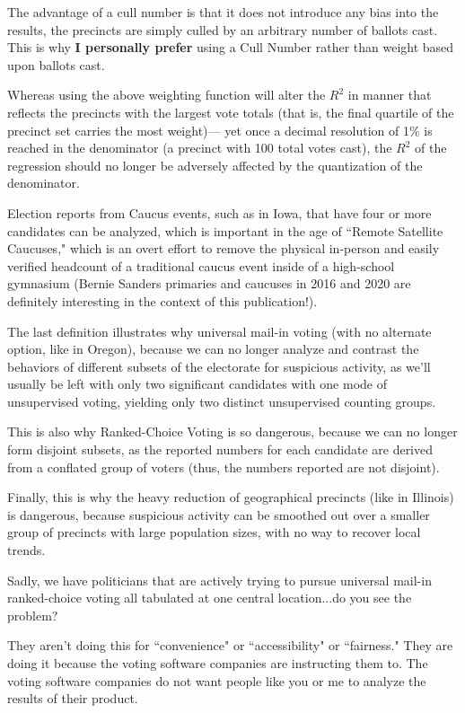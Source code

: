 \documentclass[preprint,13pt]{elsarticle}
\begin{document}
The advantage of a cull number is that it does not introduce any  bias into the results, the precincts are simply culled by an arbitrary number of ballots cast. This is why \textbf{I personally prefer} using a Cull Number rather than weight based upon ballots cast.

Whereas using the above weighting function will alter the $R^2$ in manner that reflects the precincts with the largest vote totals (that is, the final quartile of the precinct set carries the most weight)--- yet once a decimal resolution of 1\% is reached in the denominator (a precinct with 100 total votes cast), the $R^2$ of the regression should no longer be adversely affected by the quantization of the denominator.

Election reports from Caucus events, such as in Iowa, that have four or more candidates can be analyzed, which is important in the age of ``Remote Satellite Caucuses," which is an overt effort to remove the physical in-person and easily verified headcount of a traditional caucus event inside of a high-school gymnasium (Bernie Sanders primaries and caucuses in 2016 and 2020 are definitely interesting in the context of this publication!).

The last definition illustrates why universal mail-in voting (with no alternate option, like in Oregon), because we can no longer analyze and contrast the behaviors of different subsets of the electorate for suspicious activity, as we'll usually be left with only two significant candidates with one mode of unsupervised voting, yielding only two distinct unsupervised counting groups.

This is also why Ranked-Choice Voting is so dangerous, because we can no longer form disjoint subsets, as the reported numbers for each candidate are derived from a conflated group of voters (thus, the numbers reported are not disjoint).

Finally, this is why the heavy reduction of geographical precincts (like in Illinois) is dangerous, because suspicious activity can be smoothed out over a smaller group of precincts with large population sizes, with no way to recover local trends.

Sadly, we have politicians that are actively trying to pursue universal mail-in ranked-choice voting all tabulated at one central location...do you see the problem? 

They aren't doing this for ``convenience" or ``accessibility" or ``fairness." They are doing it because the voting software companies are instructing them to. The voting software companies do not want people like you or me to analyze the results of their product.
\newpage
\end{document}
